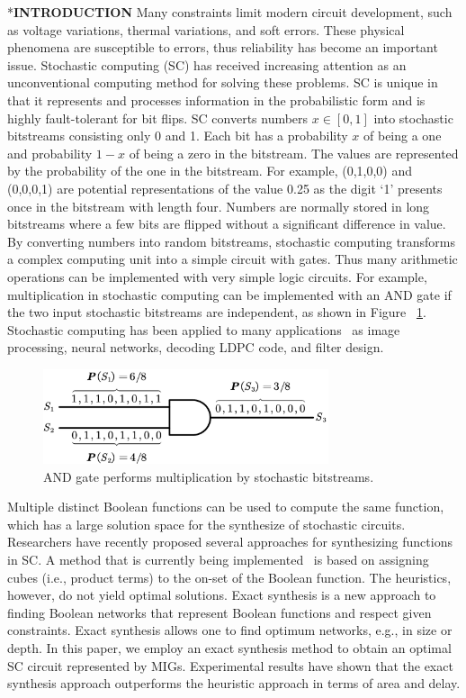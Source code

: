 \documentclass[conference,letterpaper]{IEEEtran}
\makeatletter
\renewcommand{\section}{\@startsection{section}{1}{0mm}
    {-\baselineskip}{0.001\baselineskip}{\bf\leftline}}
\makeatother
\begin{document}
\section*{\textbf{\large INTRODUCTION}}
Many constraints limit modern circuit development, such as voltage variations, thermal variations, and soft errors. These physical phenomena are susceptible to errors, thus reliability has become an important issue. Stochastic computing (SC) has received increasing attention as an unconventional computing method for solving these problems. SC is unique in that it represents and processes information in the probabilistic form and is highly fault-tolerant for bit flips. SC converts numbers $x\in[0,1]$ into stochastic bitstreams consisting only 0 and 1. 
Each bit has a probability $x$ of being a one and probability $1-x$ of being a zero in the bitstream. The values are represented by the probability of the one in the bitstream. For example, (0,1,0,0) and (0,0,0,1) are potential representations of the value 0.25 as the digit `1' presents once in the bitstream with length four. Numbers are normally stored in long bitstreams where a few bits are flipped without a significant difference in value. By converting numbers into random bitstreams, stochastic computing transforms a complex computing unit into a simple circuit with gates. Thus many arithmetic operations can be implemented with very simple logic circuits. For example, multiplication in stochastic computing can be implemented with an AND gate if the two input stochastic bitstreams are independent, as shown in Figure ~\ref{fig:sto}. 
Stochastic computing has been applied to many applications~\cite{1} as image processing, neural networks, decoding LDPC code, and filter design.


\begin{figure}[t]
	\centering
	\includegraphics[width=3.3in]{fig/AND3.pdf}
	\caption{\label{fig:sto}AND gate performs multiplication by stochastic bitstreams.}  \vspace{-3.5ex}
\end{figure}

Multiple distinct Boolean functions can be used to compute the same function, which has a large solution space for the synthesize of stochastic circuits. 
Researchers have recently proposed several approaches for synthesizing functions in SC. 
A method that is currently being implemented~\cite{2} is based on assigning cubes (i.e., product terms) to the on-set of the Boolean function. The heuristics, however, do not yield optimal solutions. Exact synthesis is a new approach to finding Boolean networks that represent Boolean functions and respect given constraints. Exact synthesis allows one to find optimum networks, e.g., in size or depth. In this paper, we employ an exact synthesis method to obtain an optimal SC circuit represented by MIGs. Experimental results have shown that the exact synthesis approach outperforms the heuristic approach in terms of area and delay.
\end{document}
